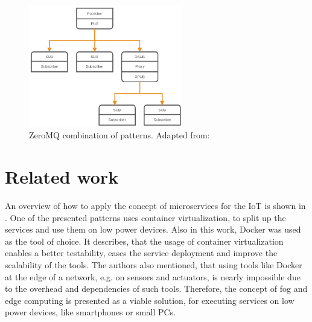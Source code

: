 \begin{figure}[H]
    \centering
    \includegraphics[width=0.6\textwidth]{resources/images/zeromq-complex.png}
    \caption[ZeroMQ combination of patterns]{ZeroMQ combination of patterns. Adapted from: \autocite{ZeroMQ:Guide}}
    \label{fig:zeromq_comination}
\end{figure}


\section{Related work}
\label{section:related_work}
An overview of how to apply the concept of microservices for the \ac{IoT} is shown in \autocite[cf.][p. 5]{Butzin:2016}.
One of the presented patterns uses container virtualization, to split up the services and use them on low power devices.
Also in this work, Docker was used as the tool of choice.
It describes, that the usage of container virtualization enables a better testability, eases the service deployment and improve the scalability of the tools.\autocite[cf.][p. 5]{Butzin:2016}
The authors also mentioned, that using tools like Docker at the edge of a network, e.g. on sensors and actuators, is nearly impossible due to the overhead and dependencies of such tools.\autocite[cf.][p. 5]{Butzin:2016}
Therefore, the concept of fog and edge computing is presented as a viable solution, for executing services on low power devices, like smartphones or small \acp{PC}.\autocite[cf.][p. 5]{Butzin:2016}

